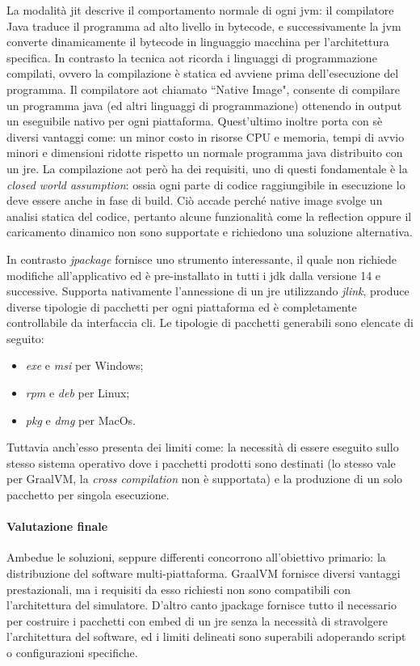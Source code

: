 La modalità \ac{jit} descrive il comportamento normale di ogni \ac{jvm}: il compilatore Java traduce il programma ad alto livello in bytecode, e successivamente la \ac{jvm} converte dinamicamente il bytecode in linguaggio macchina per l'architettura specifica. In contrasto la tecnica \ac{aot} ricorda i linguaggi di programmazione compilati, ovvero la compilazione è statica ed avviene prima dell'esecuzione del programma. Il compilatore \ac{aot} chiamato ``Native Image", consente di compilare un programma java (ed altri linguaggi di programmazione) ottenendo in output un eseguibile nativo per ogni piattaforma. Quest'ultimo inoltre porta con sè diversi vantaggi come: un minor costo in risorse CPU e memoria, tempi di avvio minori e dimensioni ridotte rispetto un normale programma java distribuito con un \ac{jre}. La compilazione \ac{aot} però ha dei requisiti, uno di questi fondamentale è la \textit{closed world assumption}: ossia ogni parte di codice raggiungibile in esecuzione lo deve essere anche in fase di build. Ciò accade perché native image svolge un analisi statica del codice, pertanto alcune funzionalità come la reflection oppure il caricamento dinamico non sono supportate e richiedono una soluzione alternativa.

In contrasto \textit{jpackage} fornisce uno strumento interessante, il quale non richiede modifiche all'applicativo ed è pre-installato in tutti i \ac{jdk} dalla versione 14 e successive. Supporta nativamente l'annessione di un \ac{jre} utilizzando \textit{jlink}, produce diverse tipologie di pacchetti per ogni piattaforma ed è completamente controllabile da interfaccia \ac{cli}. Le tipologie di pacchetti generabili sono elencate di seguito:
\begin{itemize}
	\item \textit{exe} e \textit{msi} per Windows;
	\item \textit{rpm} e \textit{deb} per Linux;
	\item \textit{pkg} e \textit{dmg} per MacOs.
\end{itemize}
Tuttavia anch'esso presenta dei limiti come: la necessità di essere eseguito sullo stesso sistema operativo dove i pacchetti prodotti sono destinati (lo stesso vale per GraalVM, la \textit{cross compilation} non è supportata) e la produzione di un solo pacchetto per singola esecuzione.

\paragraph{Valutazione finale} Ambedue le soluzioni, seppure differenti concorrono all'obiettivo primario: la distribuzione del software multi-piattaforma. GraalVM fornisce diversi vantaggi prestazionali, ma i requisiti da esso richiesti non sono compatibili con l'architettura del simulatore. D'altro canto jpackage fornisce tutto il necessario per costruire i pacchetti con embed di un \ac{jre} senza la necessità di stravolgere l'architettura del software, ed i limiti delineati sono superabili adoperando script o configurazioni specifiche.

